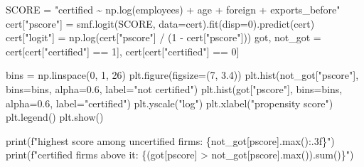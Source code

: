 \documentclass[
  letterpaper,
  10pt,
  twoside,
  openright,
  numbers=noenddot,
  chapterprefix=true]{scrbook}
\newenvironment{Shaded}{}{}
\newcommand{\BuiltInTok}[1]{\textcolor[rgb]{0.84,0.23,0.29}{#1}}
\newcommand{\DecValTok}[1]{\textcolor[rgb]{0.00,0.36,0.77}{#1}}
\newcommand{\FloatTok}[1]{\textcolor[rgb]{0.00,0.36,0.77}{#1}}
\newcommand{\NormalTok}[1]{\textcolor[rgb]{0.14,0.16,0.18}{#1}}
\newcommand{\OperatorTok}[1]{\textcolor[rgb]{0.14,0.16,0.18}{#1}}
\newcommand{\SpecialCharTok}[1]{\textcolor[rgb]{0.00,0.36,0.77}{#1}}
\newcommand{\SpecialStringTok}[1]{\textcolor[rgb]{0.01,0.18,0.38}{#1}}
\newcommand{\StringTok}[1]{\textcolor[rgb]{0.01,0.18,0.38}{#1}}
\begin{document}
\begin{Shaded}
\begin{Highlighting}[]
\NormalTok{SCORE }\OperatorTok{=} \StringTok{"certified \textasciitilde{} np.log(employees) + age + foreign + exports\_before"}
\NormalTok{cert[}\StringTok{"pscore"}\NormalTok{] }\OperatorTok{=}\NormalTok{ smf.logit(SCORE, data}\OperatorTok{=}\NormalTok{cert).fit(disp}\OperatorTok{=}\DecValTok{0}\NormalTok{).predict(cert)}
\NormalTok{cert[}\StringTok{"logit"}\NormalTok{] }\OperatorTok{=}\NormalTok{ np.log(cert[}\StringTok{"pscore"}\NormalTok{] }\OperatorTok{/}\NormalTok{ (}\DecValTok{1} \OperatorTok{{-}}\NormalTok{ cert[}\StringTok{"pscore"}\NormalTok{]))}
\NormalTok{got, not\_got }\OperatorTok{=}\NormalTok{ cert[cert[}\StringTok{"certified"}\NormalTok{] }\OperatorTok{==} \DecValTok{1}\NormalTok{], cert[cert[}\StringTok{"certified"}\NormalTok{] }\OperatorTok{==} \DecValTok{0}\NormalTok{]}

\NormalTok{bins }\OperatorTok{=}\NormalTok{ np.linspace(}\DecValTok{0}\NormalTok{, }\DecValTok{1}\NormalTok{, }\DecValTok{26}\NormalTok{)}
\NormalTok{plt.figure(figsize}\OperatorTok{=}\NormalTok{(}\DecValTok{7}\NormalTok{, }\FloatTok{3.4}\NormalTok{))}
\NormalTok{plt.hist(not\_got[}\StringTok{"pscore"}\NormalTok{], bins}\OperatorTok{=}\NormalTok{bins, alpha}\OperatorTok{=}\FloatTok{0.6}\NormalTok{, label}\OperatorTok{=}\StringTok{"not certified"}\NormalTok{)}
\NormalTok{plt.hist(got[}\StringTok{"pscore"}\NormalTok{], bins}\OperatorTok{=}\NormalTok{bins, alpha}\OperatorTok{=}\FloatTok{0.6}\NormalTok{, label}\OperatorTok{=}\StringTok{"certified"}\NormalTok{)}
\NormalTok{plt.yscale(}\StringTok{"log"}\NormalTok{)}
\NormalTok{plt.xlabel(}\StringTok{"propensity score"}\NormalTok{)}
\NormalTok{plt.legend()}
\NormalTok{plt.show()}

\BuiltInTok{print}\NormalTok{(}\SpecialStringTok{f"highest score among uncertified firms: }\SpecialCharTok{\{}\NormalTok{not\_got[}\StringTok{\textquotesingle{}pscore\textquotesingle{}}\NormalTok{]}\SpecialCharTok{.}\BuiltInTok{max}\NormalTok{()}\SpecialCharTok{:.3f\}}\SpecialStringTok{"}\NormalTok{)}
\BuiltInTok{print}\NormalTok{(}\SpecialStringTok{f"certified firms above it: }\SpecialCharTok{\{}\NormalTok{(got[}\StringTok{\textquotesingle{}pscore\textquotesingle{}}\NormalTok{] }\OperatorTok{\textgreater{}}\NormalTok{ not\_got[}\StringTok{\textquotesingle{}pscore\textquotesingle{}}\NormalTok{].}\BuiltInTok{max}\NormalTok{())}\SpecialCharTok{.}\BuiltInTok{sum}\NormalTok{()}\SpecialCharTok{\}}\SpecialStringTok{"}\NormalTok{)}
\end{Highlighting}
\end{Shaded}
\end{document}
